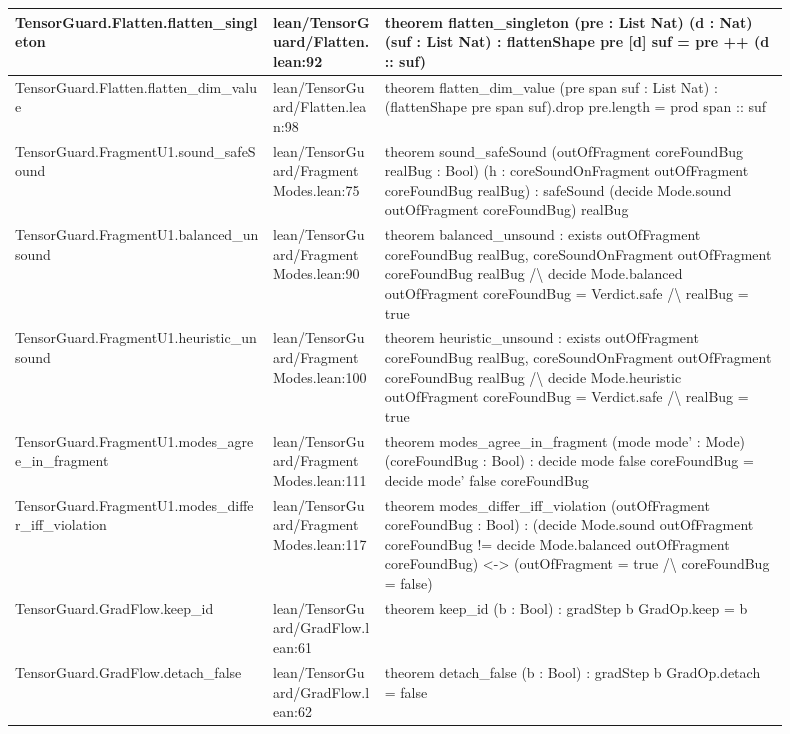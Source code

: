 \documentclass[10pt]{article}
\begin{document}
\begin{longtable}{|p{0.30\linewidth}|p{0.13\linewidth}|p{0.47\linewidth}|}
\hline
TensorGuard.Flatten.flatten\_singleton & lean/TensorGuard/Flatten.lean:92 & theorem flatten\_singleton (pre : List Nat) (d : Nat) (suf : List Nat) : flattenShape pre [d] suf = pre ++ (d :: suf) \\
\hline
TensorGuard.Flatten.flatten\_dim\_value & lean/TensorGuard/Flatten.lean:98 & theorem flatten\_dim\_value (pre span suf : List Nat) : (flattenShape pre span suf).drop pre.length = prod span :: suf \\
\hline
TensorGuard.FragmentU1.sound\_safeSound & lean/TensorGuard/FragmentModes.lean:75 & theorem sound\_safeSound (outOfFragment coreFoundBug realBug : Bool) (h : coreSoundOnFragment outOfFragment coreFoundBug realBug) : safeSound (decide Mode.sound outOfFragment coreFoundBug) realBug \\
\hline
TensorGuard.FragmentU1.balanced\_unsound & lean/TensorGuard/FragmentModes.lean:90 & theorem balanced\_unsound : exists outOfFragment coreFoundBug realBug, coreSoundOnFragment outOfFragment coreFoundBug realBug /\textbackslash{} decide Mode.balanced outOfFragment coreFoundBug = Verdict.safe /\textbackslash{} realBug = true \\
\hline
TensorGuard.FragmentU1.heuristic\_unsound & lean/TensorGuard/FragmentModes.lean:100 & theorem heuristic\_unsound : exists outOfFragment coreFoundBug realBug, coreSoundOnFragment outOfFragment coreFoundBug realBug /\textbackslash{} decide Mode.heuristic outOfFragment coreFoundBug = Verdict.safe /\textbackslash{} realBug = true \\
\hline
TensorGuard.FragmentU1.modes\_agree\_in\_fragment & lean/TensorGuard/FragmentModes.lean:111 & theorem modes\_agree\_in\_fragment (mode mode' : Mode) (coreFoundBug : Bool) : decide mode false coreFoundBug = decide mode' false coreFoundBug \\
\hline
TensorGuard.FragmentU1.modes\_differ\_iff\_violation & lean/TensorGuard/FragmentModes.lean:117 & theorem modes\_differ\_iff\_violation (outOfFragment coreFoundBug : Bool) : (decide Mode.sound outOfFragment coreFoundBug != decide Mode.balanced outOfFragment coreFoundBug) <-> (outOfFragment = true /\textbackslash{} coreFoundBug = false) \\
\hline
TensorGuard.GradFlow.keep\_id & lean/TensorGuard/GradFlow.lean:61 & theorem keep\_id (b : Bool) : gradStep b GradOp.keep = b \\
\hline
TensorGuard.GradFlow.detach\_false & lean/TensorGuard/GradFlow.lean:62 & theorem detach\_false (b : Bool) : gradStep b GradOp.detach = false \\

\end{longtable}
\end{document}
